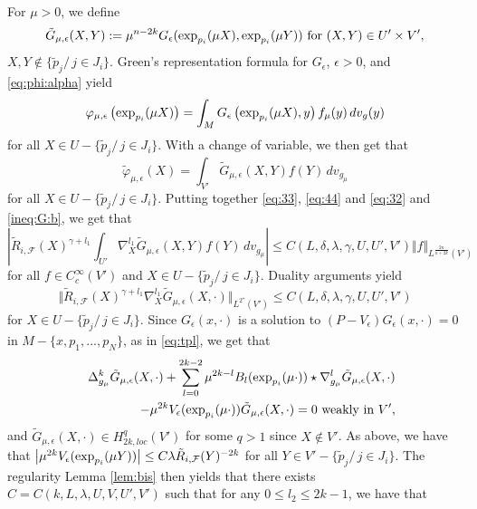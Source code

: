 \documentclass[reqno]{amsart}
\def \eps {\epsilon}
\def \crit {2^\star}
\def \F {{\mathcal F}}
\begin{document}
For $\mu>0$, we define
\begin{equation}\label{def:G:t:close}
\tilde{G}_{\mu,\eps}(X,Y):=\mu^{n-2k}G_\eps(\hbox{exp}_{p_i}(\mu X),\hbox{exp}_{p_i}(\mu Y) )\hbox{ for }(X,Y)\in U'\times V',
\end{equation}
$X,Y\not\in\{\tilde{p}_j/\, j\in J_i\}$.  Green's representation formula for $G_\eps$, $\eps>0$, and \eqref{eq:phi:alpha} yield
$$\varphi_{\mu,\eps}\left(\hbox{exp}_{p_i}(\mu X)\right)=\int_M G_\eps\left(\hbox{exp}_{p_i}(\mu X),y\right)f_\mu(y)\, dv_g(y)$$
for all $X\in U-\{\tilde{p}_j/\, j\in J_i\}$. 
With a change of variable, we then get that
\begin{equation}\label{ineq:G:b}
\tilde{\varphi}_{\mu,\eps}(X)=\int_{V'} \tilde{G}_{\mu,\eps}(X,Y) f(Y)\, dv_{g_\mu}
\end{equation}
for all $X\in U-\{\tilde{p}_j/\, j\in J_i\}$. Putting together   \eqref{eq:33}, \eqref{eq:44} and \eqref{eq:32}  and \eqref{ineq:G:b}, we get that
\begin{equation*}
\left|\tilde{R}_{i,\F}(X)^{\gamma+l_1}\int_{U'} \nabla_X^{l_1}\tilde{G}_{\mu,\eps}(X,Y) f(Y)\, dv_{g_\mu}
\right|\leq C( L, \delta, \lambda,\gamma,U,U',V') \Vert f\Vert_{L^{\frac{2n}{n+2k}}(V')}\end{equation*}
for all $f\in C^\infty_c(V')$ and $ X\in U-\{\tilde{p}_j/\, j\in J_i\}$. Duality arguments yield
\begin{equation}\label{ineq:35}
\Vert \tilde{R}_{i,\F}(X)^{\gamma+l_1}\nabla_X^{l_1} \tilde{G}_{\mu,\eps}(X,\cdot)\Vert_{L^{\crit}(V')}\leq C( L, \delta, \lambda,\gamma,U,U',V')
\end{equation}
for $X\in U-\{\tilde{p}_j/\, j\in J_i\}$. Since $G_\eps(x,\cdot)$ is a solution to $(P-V_\eps)G_\eps(x,\cdot)=0$ in $M-\{x, p_1,...,p_N\}$, as in \eqref{eq:tpl},
we get that
\begin{eqnarray*}
&&\Delta_{g_\mu}^k\tilde{G}_{\mu,\eps}(X,\cdot)+\sum_{l=0}^{2k-2}\mu^{2k-l}B_l(\hbox{exp}_{p_i}(\mu \cdot))\star\nabla_{g_\mu}^l\tilde{G}_{\mu,\eps}(X,\cdot)\\
&&-\mu^{2k}V_\eps(\hbox{exp}_{p_i}(\mu \cdot))\tilde{G}_{\mu,\eps}(X,\cdot)=0\hbox{ weakly in }V',
\end{eqnarray*}
and $\tilde{G}_{\mu,\eps}(X,\cdot)\in H_{2k,loc}^q(V')$ for some $q>1$ since $X\not\in V'$. As above, we have that $\left|\mu^{2k}V_\eps(\hbox{exp}_{p_i}(\mu Y))\right|\leq C \lambda \tilde{R}_{i,\F}(Y)^{-2k}$ for all $Y\in V'-\{\tilde{p}_j/\, j\in J_i\}$. The regularity Lemma \ref{lem:bis} then yields that there exists $C=C(k,L, \lambda,U,V,U',V')$ such that for any $0\leq l_2\leq 2k-1$, we have that
\end{document}
